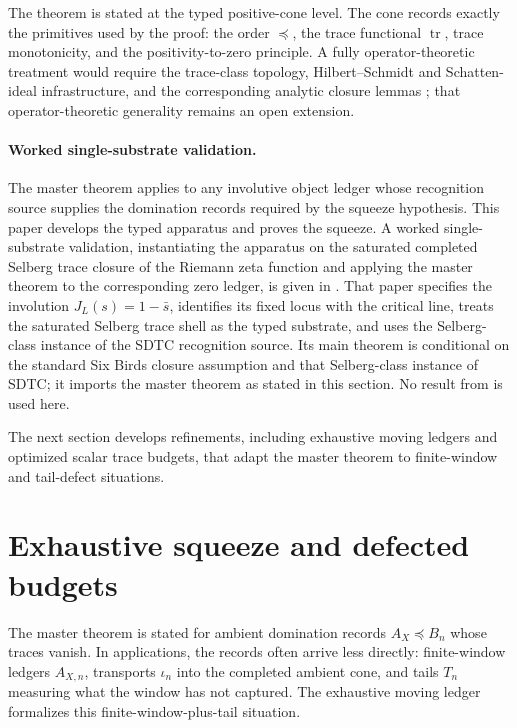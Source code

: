 \documentclass[11pt]{article}
\DeclareMathOperator{\trace}{tr}
\newcommand{\AX}{A_{X}}
\theoremstyle{definition}
\begin{document}
The theorem is stated at the typed positive-cone level.  The cone
records exactly the primitives used by the proof: the order
\(\preceq\), the trace functional \(\trace\), trace monotonicity, and
the positivity-to-zero principle.  A fully operator-theoretic
treatment would require the trace-class topology, Hilbert--Schmidt
and Schatten-ideal infrastructure, and the corresponding analytic
closure lemmas \citep{Simon2005,ReedSimon1980}; that
operator-theoretic generality remains an open extension.

\paragraph{Worked single-substrate validation.}
The master theorem applies to any involutive object ledger whose
recognition source supplies the domination records required by the
squeeze hypothesis.  This paper develops the typed apparatus and
proves the squeeze.  A worked single-substrate validation,
instantiating the apparatus on the saturated completed Selberg trace
closure of the Riemann zeta function and applying the master theorem
to the corresponding zero ledger, is given in
\citet{TsiokosRHviaSDTC2026}.  That paper specifies the involution
\(J_L(s)=1-\bar{s}\), identifies its fixed locus with the critical
line, treats the saturated Selberg trace shell as the typed
substrate, and uses the Selberg-class instance of the SDTC
recognition source.  Its main theorem is conditional on the standard
Six Birds closure assumption and that Selberg-class instance of
SDTC; it imports the master theorem as stated in this section.  No
result from \citet{TsiokosRHviaSDTC2026} is used here.

The next section develops refinements, including exhaustive moving
ledgers and optimized scalar trace budgets, that adapt the master
theorem to finite-window and tail-defect situations.
 

\section{Exhaustive squeeze and defected budgets}
\label{sec:exhaustive_squeeze_and_budgets}

The master theorem is stated for ambient domination records
\(\AX\preceq B_n\) whose traces vanish.  In applications, the records
often arrive less directly: finite-window ledgers \(A_{X,n}\),
transports \(\iota_n\) into the completed ambient cone, and tails
\(T_n\) measuring what the window has not captured.  The exhaustive
moving ledger formalizes this finite-window-plus-tail situation.
\end{document}
